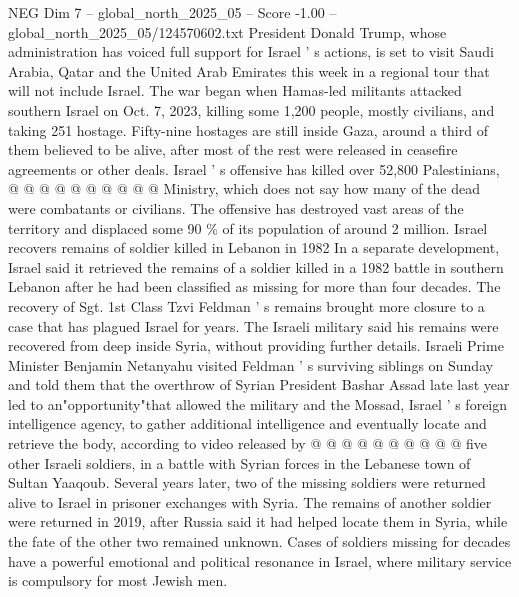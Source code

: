\begin{textsample}{NEG Dim 7 – global\_north\_2025\_05 – Score -1.00 – global\_north\_2025\_05/124570602.txt}
President Donald Trump, whose administration has voiced full support for Israel ' s actions, is set to visit Saudi Arabia, Qatar and the United Arab Emirates this week in a regional tour that will not include Israel.
The war began when Hamas-led militants attacked southern Israel on Oct. 7, 2023, killing some 1,200 people, mostly civilians, and taking 251 hostage.
Fifty-nine hostages are still inside Gaza, around a third of them believed to be alive, after most of the rest were released in ceasefire agreements or other deals.
Israel ' s offensive has killed over 52,800 Palestinians, @ @ @ @ @ @ @ @ @ @ Ministry, which does not say how many of the dead were combatants or civilians.
The offensive has destroyed vast areas of the territory and displaced some 90 \% of its population of around 2 million.
Israel recovers remains of soldier killed in Lebanon in 1982 In a separate development, Israel said it retrieved the remains of a soldier killed in a 1982 battle in southern Lebanon after he had been classified as missing for more than four decades.
The recovery of Sgt. 1st Class Tzvi Feldman ' s remains brought more closure to a case that has plagued Israel for years.
The Israeli military said his remains were recovered from deep inside Syria, without providing further details.
Israeli Prime Minister Benjamin Netanyahu visited Feldman ' s surviving siblings on Sunday and told them that the overthrow of Syrian President Bashar Assad late last year led to an"opportunity"that allowed the military and the Mossad, Israel ' s foreign intelligence agency, to gather additional intelligence and eventually locate and retrieve the body, according to video released by @ @ @ @ @ @ @ @ @ @ five other Israeli soldiers, in a battle with Syrian forces in the Lebanese town of Sultan Yaaqoub.
Several years later, two of the missing soldiers were returned alive to Israel in prisoner exchanges with Syria.
The remains of another soldier were returned in 2019, after Russia said it had helped locate them in Syria, while the fate of the other two remained unknown.
Cases of soldiers missing for decades have a powerful emotional and political resonance in Israel, where military service is compulsory for most Jewish men.

\end{textsample}
